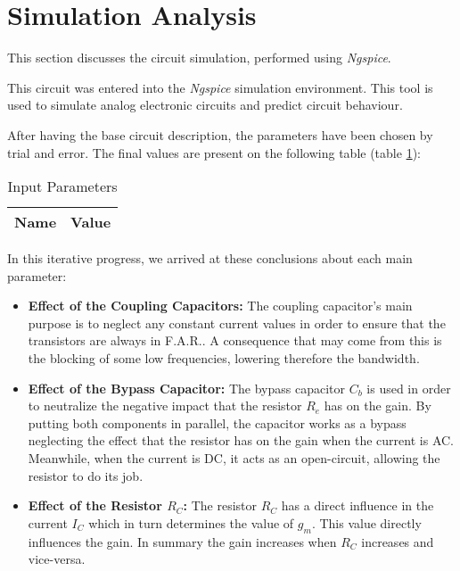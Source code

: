 \section{Simulation Analysis}
\label{sec:simulation}



\indent
 
 This section discusses the circuit simulation, performed using {\it Ngspice}. 

This circuit was entered into the {\it Ngspice} simulation environment. This tool is used to simulate analog electronic circuits and predict circuit behaviour. 

After having the base circuit description, the parameters have been chosen by trial and error. The final values are present on the following table (table \ref{tab:InputParam}):

\begin{table}[H]
  \centering
  \begin{tabular}{|l|r|}
    \hline    
    {\bf Name} & {\bf Value} \\ \hline
    
  \end{tabular}
  \caption{Input Parameters}
  \label{tab:InputParam}
\end{table}


In this iterative progress, we arrived at these conclusions about each main parameter:
 
\begin{itemize}
    \item\textbf{Effect of the Coupling Capacitors:}
    The coupling capacitor's main purpose is to neglect any constant current values in order to ensure that the transistors are always in F.A.R.. A consequence that may come from this is the blocking of some low frequencies, lowering therefore the bandwidth.

    \item\textbf{Effect of the Bypass Capacitor:}
    The bypass capacitor $C_b$ is used in order to neutralize the negative impact that the resistor $R_e$ has on the gain. By putting both components in parallel, the capacitor works as a bypass neglecting the effect that the resistor has on the gain when the current is AC.  Meanwhile, when the current is DC, it acts as an open-circuit, allowing the resistor to do its job.
 
    \item\textbf{Effect of the Resistor $R_C$:}
    The resistor $R_C$ has a direct influence in the current $I_C$ which in turn determines the value of $g_m$. This value directly influences the gain. In summary the gain increases when $R_C$ increases and vice-versa.
\end{itemize}    

